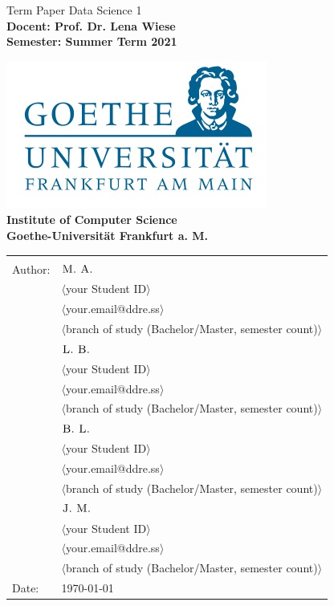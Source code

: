 \begin{center}

{\Huge {
Term Paper Data Science 1}
}
\\[2ex]

\textbf{
\Large 
Docent: Prof. Dr. Lena Wiese \\ 
Semester: Summer Term 2021\\  
}



\includegraphics[scale=0.4]{images/logo.jpg} \\ 
\large{\textbf{Institute of Computer Science \\ Goethe-Universit\"at Frankfurt a. M.}}



\begin{normalsize}
\begin{tabular}{ll}
& \\
Author: & $\textsc{M. A.}$ \\
& $\langle$your Student ID$\rangle$\\
& $\langle$your.email@ddre.ss$\rangle$ \\
& $\langle$branch of study (Bachelor/Master, semester count)$\rangle$ \\
& $\textsc{L. B.}$ \\
& $\langle$your Student ID$\rangle$\\
& $\langle$your.email@ddre.ss$\rangle$ \\
& $\langle$branch of study (Bachelor/Master, semester count)$\rangle$ \\
& $\textsc{B. L.}$ \\
& $\langle$your Student ID$\rangle$\\
& $\langle$your.email@ddre.ss$\rangle$ \\
& $\langle$branch of study (Bachelor/Master, semester count)$\rangle$ \\
& $\textsc{J. M.}$ \\
& $\langle$your Student ID$\rangle$\\
& $\langle$your.email@ddre.ss$\rangle$ \\
& $\langle$branch of study (Bachelor/Master, semester count)$\rangle$ \\
Date: & \today \\		
\end{tabular}
\end{normalsize}

\end{center}

